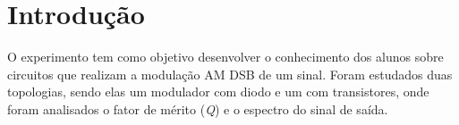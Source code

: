 \newpage

\section{Introdução}
O experimento tem como objetivo desenvolver o conhecimento dos alunos sobre circuitos que realizam a modulação AM DSB de um sinal. Foram estudados duas topologias, sendo elas um modulador com diodo e um com transistores, onde foram analisados o fator de mérito (\textit{Q}) e o espectro do sinal de saída.